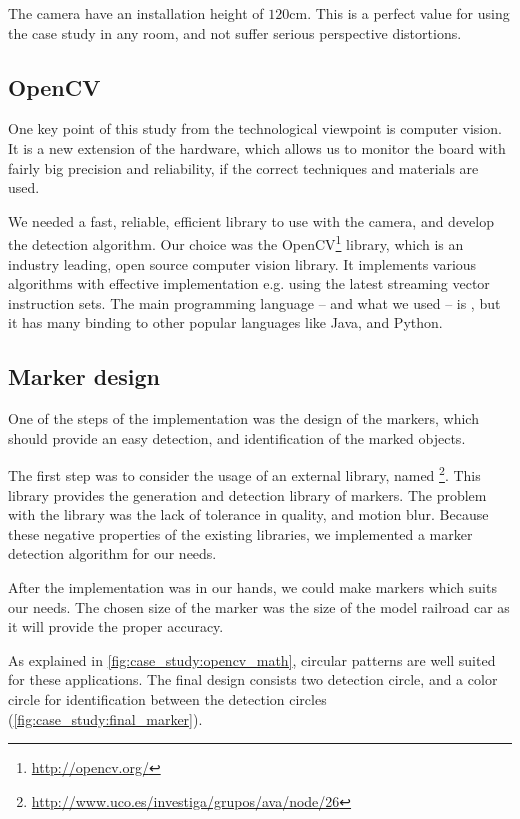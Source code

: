 The camera have an installation height of $120$\si{\centi\meter}. This is a perfect value for using the case study in any room, and not suffer serious perspective distortions.

\subsection{OpenCV}

One key point of this study from the technological viewpoint is computer vision. It is a new extension of the hardware, which allows us to monitor the board with fairly big precision and reliability, if the correct techniques and materials are used.

We needed a fast, reliable, efficient library to use with the camera, and develop the detection algorithm. Our choice was the OpenCV\footnote{\url{http://opencv.org/}} library, which is an industry leading, open source computer vision library. It implements various algorithms with effective implementation e.g. using the latest streaming vector instruction sets. The main programming language -- and what we used -- is , but it has many binding to other popular languages like Java, and Python.

\subsection{Marker design}

One of the steps of the  implementation was the design of the markers, which should provide an easy detection, and identification of the marked objects.

The first step was to consider the usage of an external library, named \footnote{\url{http://www.uco.es/investiga/grupos/ava/node/26}}. This library provides the generation and detection library of markers. The problem with the library was the lack of tolerance in quality, and motion blur. Because these negative properties of the existing libraries, we implemented a marker detection algorithm for our needs.

After the implementation was in our hands, we could make markers which suits our needs. The chosen size of the marker was the size of the model railroad car as it will provide the proper accuracy.

As explained in \cref{fig:case_study:opencv_math}, circular patterns are well suited for these applications. The final design consists two detection circle, and a color circle for identification between the detection circles (\cref{fig:case_study:final_marker}).

